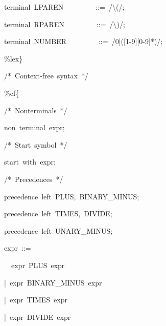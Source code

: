 \documentclass[12pt,english,twoside]{report}
\newenvironment{codeblock}
{\begin{list}{}{
\setlength{\rightmargin}{\leftmargin}
\setlength{\listparindent}{0pt}%
\raggedright
\setlength{\itemsep}{0pt}
\setlength{\parsep}{0pt}
\normalfont\ttfamily}%
 \item[]}
{\end{list}}
\begin{document}
\begin{algorithm}
\begin{codeblock}
\begin{codeblock}
{\small terminal~LPAREN~~~~~~~~~::=~/\textbackslash{}(/;}{\small \par}

{\small terminal~RPAREN~~~~~~~~~::=~/\textbackslash{})/;}{\small \par}

{\small terminal~NUMBER~~~~~~~~~::=~/0|({[}1-9]{[}0-9]{*})/;}{\small \par}
\end{codeblock}
{\small \%lex\}}{\small \par}



{\small /{*}~Context-free~syntax~{*}/}{\small \par}

{\small \%cf\{}{\small \par}
\begin{codeblock}
{\small /{*}~Nonterminals~{*}/}{\small \par}

{\small non~terminal~expr;}{\small \par}



{\small /{*}~Start~symbol~{*}/}{\small \par}

{\small start~with~expr;}{\small \par}



{\small /{*}~Precedences~{*}/}{\small \par}

{\small precedence~left~PLUS,~BINARY\_MINUS;}{\small \par}

{\small precedence~left~TIMES,~DIVIDE;}{\small \par}

{\small precedence~left~UNARY\_MINUS;}{\small \par}



{\small expr~::=}{\small \par}
\begin{codeblock}
~{\small ~expr~PLUS~expr}{\small \par}

{\small |~expr~BINARY\_MINUS~expr}{\small \par}

{\small |~expr~TIMES~expr}{\small \par}

{\small |~expr~DIVIDE~expr}{\small \par}


\end{codeblock}
\end{codeblock}
\end{codeblock}
\end{algorithm}
\end{document}
